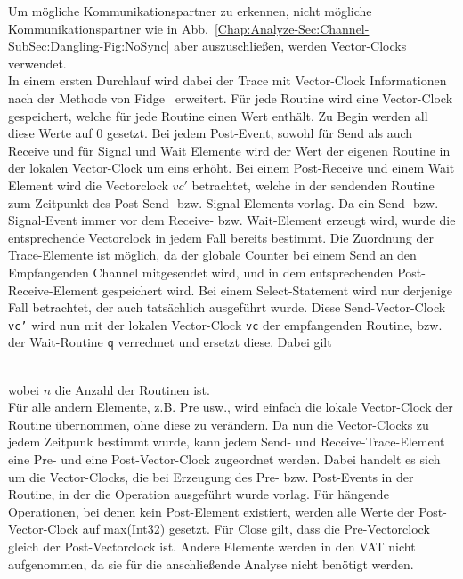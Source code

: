 Um mögliche Kommunikationspartner zu erkennen, nicht mögliche Kommunikationspartner wie in 
Abb.~\ref{Chap:Analyze-Sec:Channel-SubSec:Dangling-Fig:NoSync} aber auszuschließen, werden
Vector-Clocks verwendet.\\
In einem ersten Durchlauf wird dabei der Trace mit Vector-Clock Informationen nach der Methode 
von Fidge~\cite{Fidge} erweitert. Für jede Routine 
wird eine Vector-Clock gespeichert, welche für jede Routine einen Wert enthält. Zu Begin werden 
all diese Werte auf 0 gesetzt. Bei jedem Post-Event, sowohl für Send als auch Receive und für 
Signal und Wait Elemente wird der Wert der eigenen Routine in der lokalen Vector-Clock um eins 
erhöht. Bei einem Post-Receive und einem Wait Element wird die Vectorclock $vc'$ betrachtet, 
welche in der sendenden Routine zum Zeitpunkt des Post-Send- bzw. Signal-Elements vorlag. 
Da ein Send- bzw. Signal-Event immer vor dem Receive- bzw. Wait-Element erzeugt wird, wurde 
die entsprechende Vectorclock in jedem Fall bereits bestimmt. Die Zuordnung der Trace-Elemente 
ist möglich, da der globale Counter bei einem Send an den Empfangenden Channel mitgesendet 
wird, und in dem entsprechenden Post-Receive-Element gespeichert wird.
Bei einem Select-Statement wird nur derjenige Fall betrachtet, der auch tatsächlich ausgeführt wurde.
Diese Send-Vector-Clock \texttt{vc'}
wird nun mit der lokalen Vector-Clock \texttt{vc} der empfangenden Routine, bzw. der Wait-Routine 
\texttt{q} verrechnet und ersetzt diese. Dabei gilt\\
\begin{figure}[h]
  \centering
  
\end{figure}\\
wobei $n$ die Anzahl der Routinen ist.\\
Für alle andern Elemente, z.B. Pre usw., wird einfach die lokale Vector-Clock der Routine übernommen, 
ohne diese zu verändern. Da nun die Vector-Clocks zu jedem Zeitpunk bestimmt wurde, kann jedem 
Send- und Receive-Trace-Element eine Pre- und eine Post-Vector-Clock zugeordnet werden. 
Dabei handelt es sich um die Vector-Clocks, die bei Erzeugung des Pre- bzw. Post-Events in 
der Routine, in der die Operation ausgeführt wurde vorlag. Für hängende Operationen, 
bei denen kein Post-Element existiert, werden alle Werte der Post-Vector-Clock auf 
max(Int32) gesetzt. Für Close gilt, 
dass die Pre-Vectorclock gleich der Post-Vectorclock ist. Andere Elemente 
werden in den VAT nicht aufgenommen, da sie 
für die anschließende Analyse nicht benötigt werden.

